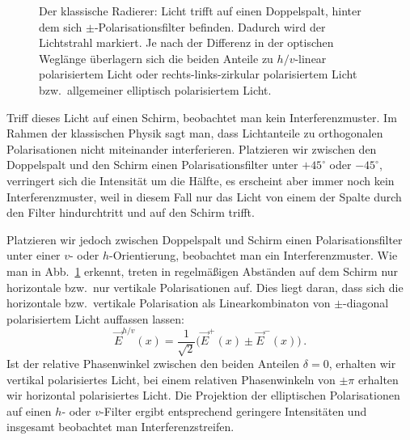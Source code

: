\begin{figure}[htb]
\caption{\label{fig_DSklass}%
Der klassische Radierer: Licht trifft auf einen Doppelspalt, hinter dem sich $\pm$-Polarisationsfilter
befinden. Dadurch wird der Lichtstrahl \glqq markiert\grqq. Je nach der Differenz in der optischen
Wegl\"ange \"uberlagern sich die beiden Anteile zu $h/v$-linear polarisiertem Licht oder 
rechts-links-zirkular polarisiertem Licht bzw.\ allgemeiner elliptisch polarisiertem Licht.} 
\end{figure}

Triff dieses Licht auf einen Schirm, beobachtet man kein Interferenzmuster. Im Rahmen der
klassischen Physik sagt man, dass Lichtanteile zu orthogonalen Polarisationen nicht
miteinander interferieren. Platzieren wir zwischen den Doppelspalt und den Schirm einen
Polarisationsfilter unter $+ 45^\circ$ oder $-45^\circ$, verringert sich die Intensit\"at um die
H\"alfte, es erscheint aber immer noch kein Interferenzmuster, weil in diesem Fall nur das
Licht von einem der Spalte durch den Filter hindurchtritt und auf den Schirm trifft. 

Platzieren wir jedoch zwischen Doppelspalt und Schirm einen Polarisationsfilter unter einer
$v$- oder $h$-Orientierung,
beobachtet man ein Interferenzmuster. Wie man in Abb.\ \ref{fig_DSklass} erkennt, treten in
regelm\"a\ss igen Abst\"anden auf dem Schirm nur horizontale bzw.\ nur vertikale Polarisationen
auf. Dies liegt daran, dass sich die horizontale bzw.\ vertikale Polarisation als Linearkombinaton
von $\pm$-diagonal polarisiertem Licht auffassen lassen:
\begin{equation}
             \vec{E}^{h/v}(x) = \frac{1}{\sqrt{2}} \big( \vec{E}^{+}(x) \pm \vec{E}^{-}(x) \big) \, .
\end{equation}
Ist der relative Phasenwinkel zwischen den beiden Anteilen $\delta=0$,
erhalten wir vertikal polarisiertes Licht, bei einem relativen Phasenwinkeln von $\pm \pi$ erhalten wir
horizontal polarisiertes Licht. Die Projektion der elliptischen Polarisationen auf einen $h$- oder $v$-Filter
ergibt entsprechend geringere Intensit\"aten und insgesamt beobachtet man Interferenzstreifen.

